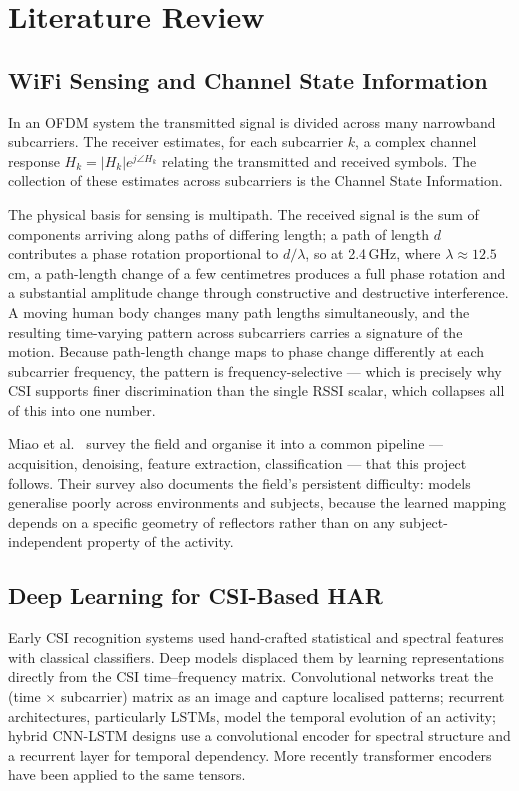 \chapter{Literature Review}
\label{ch:literature}

\section{WiFi Sensing and Channel State Information}

In an OFDM system the transmitted signal is divided across many narrowband
subcarriers. The receiver estimates, for each subcarrier $k$, a complex
channel response $H_k = |H_k| e^{j\angle H_k}$ relating the transmitted and
received symbols. The collection of these estimates across subcarriers is the
Channel State Information.

The physical basis for sensing is multipath. The received signal is the sum
of components arriving along paths of differing length; a path of length $d$
contributes a phase rotation proportional to $d/\lambda$, so at 2.4\,GHz,
where $\lambda \approx 12.5$\,cm, a path-length change of a few centimetres
produces a full phase rotation and a substantial amplitude change through
constructive and destructive interference. A moving human body changes many
path lengths simultaneously, and the resulting time-varying pattern across
subcarriers carries a signature of the motion. Because path-length change
maps to phase change differently at each subcarrier frequency, the pattern is
frequency-selective --- which is precisely why CSI supports finer
discrimination than the single RSSI scalar, which collapses all of this into
one number.

Miao et al.\ \cite{miao2025survey} survey the field and organise it into a
common pipeline --- acquisition, denoising, feature extraction,
classification --- that this project follows. Their survey also documents the
field's persistent difficulty: models generalise poorly across environments
and subjects, because the learned mapping depends on a specific geometry of
reflectors rather than on any subject-independent property of the activity.

\section{Deep Learning for CSI-Based HAR}

Early CSI recognition systems used hand-crafted statistical and spectral
features with classical classifiers. Deep models displaced them by learning
representations directly from the CSI time--frequency matrix. Convolutional
networks treat the (time $\times$ subcarrier) matrix as an image and capture
localised patterns; recurrent architectures, particularly LSTMs, model the
temporal evolution of an activity; hybrid CNN-LSTM designs use a
convolutional encoder for spectral structure and a recurrent layer for
temporal dependency. More recently transformer encoders have been applied to
the same tensors.

